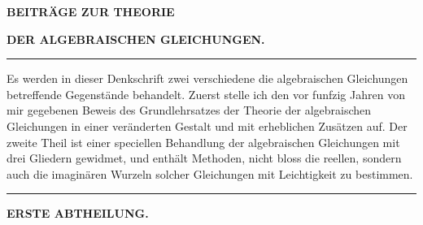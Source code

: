 \begin{center}
{\large\bfseries BEITRÄGE ZUR THEORIE\par}
\medskip
{\Large\bfseries DER ALGEBRAISCHEN GLEICHUNGEN.\par}
\medskip
\rule{0.18\linewidth}{0.4pt}
\end{center}

Es werden in dieser Denkschrift zwei verschiedene die algebraischen
Gleichungen betreffende Gegenstände behandelt. Zuerst stelle ich den
vor funfzig Jahren von mir gegebenen Beweis des Grundlehrsatzes der
Theorie der algebraischen Gleichungen in einer veränderten Gestalt
und mit erheblichen Zusätzen auf. Der zweite Theil ist einer speciellen
Behandlung der algebraischen Gleichungen mit drei Gliedern gewidmet,
und enthält Methoden, nicht bloss die reellen, sondern auch die
imaginären Wurzeln solcher Gleichungen mit Leichtigkeit zu bestimmen.

\begin{center}
\rule{0.18\linewidth}{0.4pt}\par
\medskip
\textbf{ERSTE ABTHEILUNG.}
\end{center}

